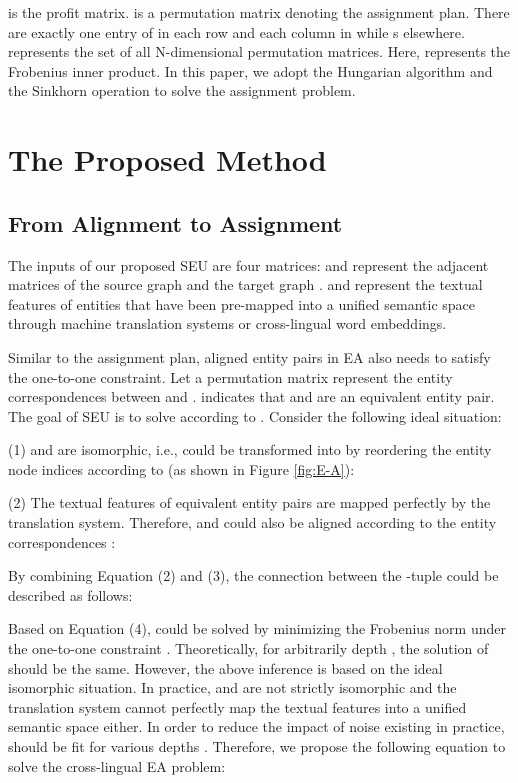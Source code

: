 \documentclass[11pt]{article}
\begin{document}
 is the profit matrix.
 is a permutation matrix denoting the assignment plan.
There are exactly one entry of  in each row and each column in  while s elsewhere.
 represents the set of all N-dimensional permutation matrices.
Here,  represents the Frobenius inner product.
In this paper, we adopt the Hungarian algorithm \cite{kuhn1955hungarian} and the Sinkhorn operation \cite{DBLP:conf/nips/Cuturi13} to solve the assignment problem.

\section{The Proposed Method}

\subsection{From Alignment to Assignment}
\label{proof}
The inputs of our proposed SEU are four matrices:
 and  represent the adjacent matrices of the source graph  and the target graph .
 and  represent the textual features of entities that have been pre-mapped into a unified semantic space through machine translation systems or cross-lingual word embeddings.

Similar to the assignment plan, aligned entity pairs in EA also needs to satisfy the one-to-one constraint.
Let a permutation matrix  represent the entity correspondences between  and .
 indicates that  and  are an equivalent entity pair.
The goal of SEU is to solve  according to .
Consider the following ideal situation:

(1)  and  are isomorphic, i.e.,  could be transformed into  by reordering the entity node indices according to  (as shown in Figure \ref{fig:E-A}):


(2) The textual features of equivalent entity pairs are mapped perfectly by the translation system. Therefore,  and  could also be aligned according to the entity correspondences :


By combining Equation (2) and (3), the connection between the -tuple  could be described as follows:

Based on Equation (4),  could be solved by minimizing the Frobenius norm  under the one-to-one constraint .
Theoretically, for arbitrarily depth , the solution of  should be the same.
However, the above inference is based on the ideal isomorphic situation.
In practice,  and  are not strictly isomorphic and the translation system cannot perfectly map the textual features into a unified semantic space either.
In order to reduce the impact of noise existing in practice,  should be fit for various depths .
Therefore, we propose the following equation to solve the cross-lingual EA problem:
\end{document}
